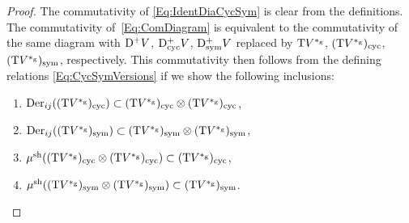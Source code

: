 \documentclass[\MainFolder/Text.tex]{subfiles}
\begin{document}
\begin{proof}
The commutativity of \eqref{Eq:IdentDiaCycSym} is clear from the definitions. The commutativity of~\eqref{Eq:ComDiagram} is equivalent to the commutativity of the same diagram with $\mathrm{D}^+ V$, $\mathrm{D}^+_{\mathrm{cyc}} V$, $\mathrm{D}_{\mathrm{sym}}^+ V$ replaced by $\mathrm{T} V^{*_{\mathrm{g}}}$, $(\mathrm{T} V^{*_{\mathrm{g}}})_{\mathrm{cyc}}$, $(\mathrm{T} V^{*_{\mathrm{g}}})_{\mathrm{sym}}$, respectively. This commutativity then follows from the defining relations \eqref{Eq:CycSymVersions} if we show the following inclusions:
\begin{enumerate}[label=(\arabic*)]
\item $\mathrm{Der}_{ij}((\mathrm{T} V^{*_{\mathrm{g}}})_{\mathrm{cyc}})\subset(\mathrm{T} V^{*_{\mathrm{g}}})_{\mathrm{cyc}}\otimes(\mathrm{T} V^{*_{\mathrm{g}}})_{\mathrm{cyc}}$, 
\item $\mathrm{Der}_{ij}((\mathrm{T} V^{*_{\mathrm{g}}})_{\mathrm{sym}})\subset(\mathrm{T} V^{*_{\mathrm{g}}})_{\mathrm{sym}}\otimes(\mathrm{T} V^{*_{\mathrm{g}}})_{\mathrm{sym}}$,
\item $\mu^{\mathrm{sh}}((\mathrm{T} V^{*_{\mathrm{g}}})_{\mathrm{cyc}}\otimes(\mathrm{T} V^{*_{\mathrm{g}}})_{\mathrm{cyc}})\subset (\mathrm{T} V^{*_{\mathrm{g}}})_{\mathrm{cyc}}$,
\item $\mu^{\mathrm{sh}}((\mathrm{T} V^{*_{\mathrm{g}}})_{\mathrm{sym}}\otimes(\mathrm{T} V^{*_{\mathrm{g}}})_{\mathrm{sym}})\subset (\mathrm{T} V^{*_{\mathrm{g}}})_{\mathrm{sym}}$. 
\end{enumerate}

\end{proof}
\end{document}
